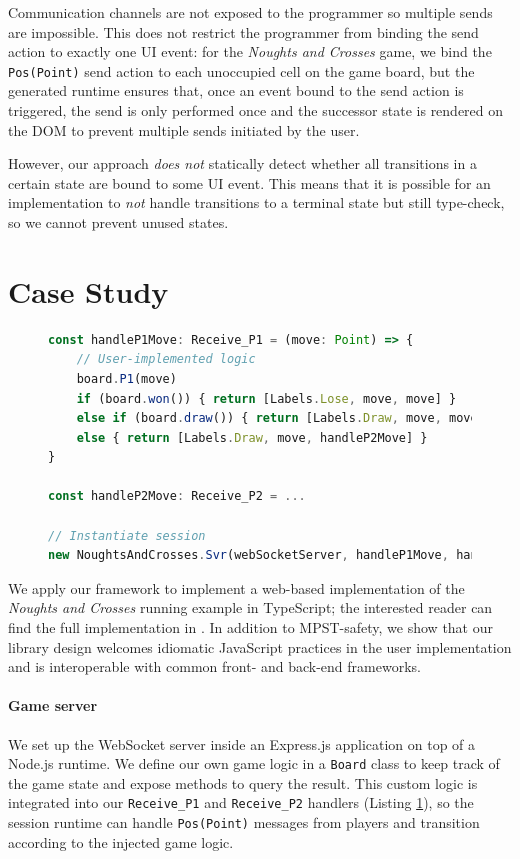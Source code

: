 \documentclass[submission,copyright,creativecommons]{eptcs}
\begin{document}
Communication channels are not exposed to the programmer so multiple sends are impossible. This does not restrict the programmer from binding the send action to exactly one UI event: for the \textit{Noughts and Crosses} game, we bind the \texttt{Pos(Point)} send action to each unoccupied cell on the game board, but the generated runtime ensures that, once an event bound to the send action is triggered, the send is only performed once and the successor state is rendered on the DOM to prevent multiple sends initiated by the user.

However, our approach \textit{does not} statically detect whether all transitions in a certain state are bound to some UI event. This means that it is possible for an implementation to \textit{not} handle transitions to a terminal state but still type-check, so we cannot prevent unused states.

\section{Case Study}
\label{section:example}

\begin{figure}
\begin{lstlisting}[language=JavaScript, tabsize=4]
const handleP1Move: Receive_P1 = (move: Point) => {
	// User-implemented logic
	board.P1(move)
	if (board.won()) { return [Labels.Lose, move, move] }
	else if (board.draw()) { return [Labels.Draw, move, move] }
	else { return [Labels.Draw, move, handleP2Move] } 
}

const handleP2Move: Receive_P2 = ...

// Instantiate session
new NoughtsAndCrosses.Svr(webSocketServer, handleP1Move, handleP2Move)
\end{lstlisting}  
\label{lst:svrprotocol}
\end{figure}

We apply our framework to implement a web-based implementation of the \textit{Noughts and Crosses} running example in TypeScript; the interested reader can find the full implementation in \cite{NoughtsAndCrosses}. In addition to MPST-safety, we show that our library design welcomes idiomatic JavaScript practices in the user implementation and is interoperable with common front- and back-end frameworks.
 
\paragraph{Game server} We set up the WebSocket server inside an Express.js \cite{ExpressJS} application on top of a Node.js \cite{NodeJS} runtime. We define our own game logic in a \texttt{Board} class to keep track of the game state and expose methods to query the result. This custom logic is integrated into our \texttt{Receive\_P1} and \texttt{Receive\_P2} handlers (Listing \ref{lst:svrprotocol}), so the session runtime can handle \texttt{Pos(Point)} messages from players and transition according to the injected game logic. 
\end{document}
